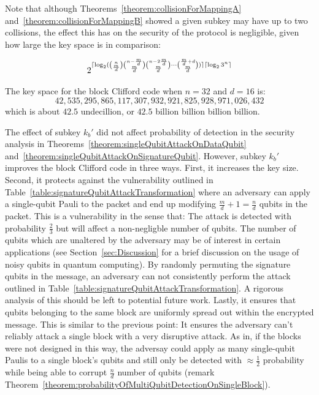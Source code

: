 Note that although Theorems~\ref{theorem:collisionForMappingA} and~\ref{theorem:collisionForMappingB} showed a given subkey may have up to two collisions, the effect this has on the security of the protocol is negligible, given how large the key space is in comparison:

\begin{align}
2^{\lceil\log_2 ({n \choose \frac{m}{d}}{n - \frac{m}{d} \choose \frac{m}{d}}{n - 2\frac{m}{d} \choose \frac{m}{d}}\cdots{\frac{m}{d} + d \choose \frac{m}{d}})\rceil\lceil\log_2 3^n\rceil}
\end{align}

\begin{example}
The key space for the block Clifford code when $n = 32$ and $d = 16$ is:
$$42,535,295,865,117,307,932,921,825,928,971,026,432$$
which is about $42.5$ undecillion, or $42.5$ billion billion billion billion.
\end{example}

The effect of subkey $k_b'$ did not affect probability of detection in the security analysis in Theorems~\ref{theorem:singleQubitAttackOnDataQubit} and~\ref{theorem:singleQubitAttackOnSignatureQubit}. However, subkey $k_b'$ improves the block Clifford code in three ways. First, it increases the key size. Second, it protects against the vulnerability outlined in Table~\ref{table:signatureQubitAttackTransformation} where an adversary can apply a single-qubit Pauli to the packet and end up modifying $\frac{m}{d} + 1 = \frac{n}{d}$ qubits in the packet. This is a vulnerability in the sense that: The attack is detected with probability $\frac{2}{3}$ but will affect a non-negligble number of qubits. The number of qubits which are unaltered by the adversary may be of interest in certain applications (see Section~\ref{sec:Discussion} for a brief discussion on the usage of noisy qubits in quantum computing). By randomly permuting the signature qubits in the message, an adversary can not consistently perform the attack outlined in Table~\ref{table:signatureQubitAttackTransformation}. A rigorous analysis of this should be left to potential future work. Lastly, it ensures that qubits belonging to the same block are uniformly spread out within the encrypted message. This is similar to the previous point: It ensures the adversary can't reliably attack a single block with a very disruptive attack. As in, if the blocks were not designed in this way, the adversay could apply as many single-qubit Paulis to a single block's qubits and still only be detected with $\approx \frac{1}{2}$ probability while being able to corrupt $\frac{n}{d}$ number of qubits (remark Theorem~\ref{theorem:probabilityOfMultiQubitDetectionOnSingleBlock}).

